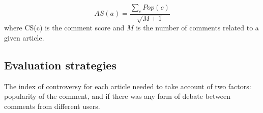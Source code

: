 \begin{equation}
AS(a) = \frac{\sum_{c} Pop(c)}{\sqrt{M+1}}
\end{equation}
where CS(c) is the comment score and $M$ is the number of comments related to a given article.



\subsection{Evaluation strategies}

The index of controversy for each article needed to take account of two factors: popularity of the comment, and if there was any form of debate between comments from different users.